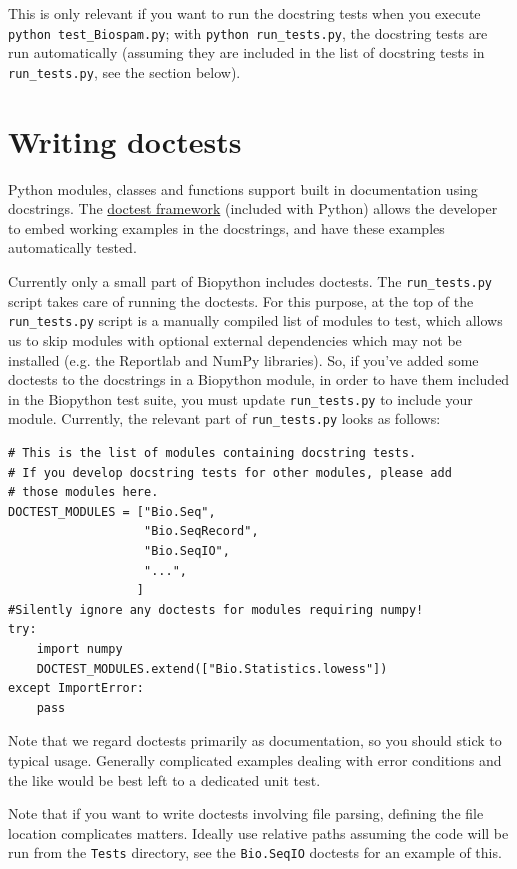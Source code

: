 \documentclass{report}
\begin{document}
This is only relevant if you want to run the docstring tests when you
execute \verb|python test_Biospam.py|; with
\verb|python run_tests.py|, the docstring tests are run automatically
(assuming they are included in the list of docstring tests in
\verb|run_tests.py|, see the section below).

\section{Writing doctests}
\label{section:doctest}

Python modules, classes and functions support built in documentation using
docstrings.  The \href{http://docs.python.org/library/doctest.html}{doctest
framework} (included with Python) allows the developer to embed working
examples in the docstrings, and have these examples automatically tested.

Currently only a small part of Biopython includes doctests. The
\verb|run_tests.py| script takes care of running the doctests.
For this purpose, at the top of the \verb|run_tests.py| script is a
manually compiled list of modules to test, which
allows us to skip modules with optional external dependencies which may
not be installed (e.g. the Reportlab and NumPy libraries).  So, if you've
added some doctests to the docstrings in a Biopython module, in order to
have them included in the Biopython test suite, you must update
\verb|run_tests.py| to include your module. Currently, the relevant part
of \verb|run_tests.py| looks as follows:

\begin{verbatim}
# This is the list of modules containing docstring tests.
# If you develop docstring tests for other modules, please add
# those modules here.
DOCTEST_MODULES = ["Bio.Seq",
                   "Bio.SeqRecord",
                   "Bio.SeqIO",
                   "...",
                  ]
#Silently ignore any doctests for modules requiring numpy!
try:
    import numpy
    DOCTEST_MODULES.extend(["Bio.Statistics.lowess"])
except ImportError:
    pass
\end{verbatim}

Note that we regard doctests primarily as documentation, so you should
stick to typical usage. Generally complicated examples dealing with error
conditions and the like would be best left to a dedicated unit test.

Note that if you want to write doctests involving file parsing, defining
the file location complicates matters.  Ideally use relative paths assuming
the code will be run from the \verb|Tests| directory, see the
\verb|Bio.SeqIO| doctests for an example of this.
\end{document}
